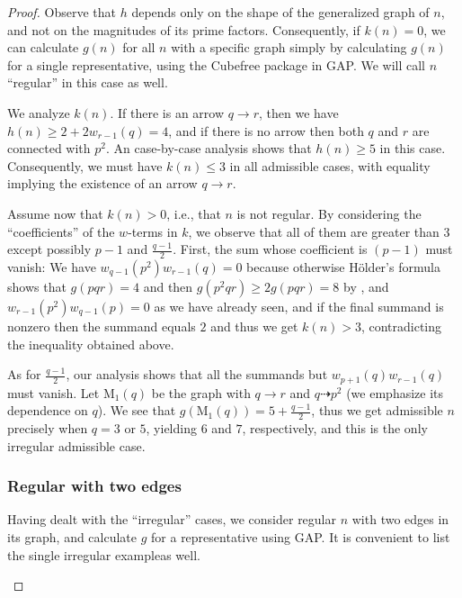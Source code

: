 \documentclass[a4paper, 12pt]{article}
\newcommand{\m}[1]{\text{M}_{#1}}
\newcommand{\hthref}[1]{\hyperref[#1]{\thref{#1}}}
\theoremstyle{plain}
\theoremstyle{definition}
\begin{document}
\begin{proof}
Observe that $h$ depends only on the shape of the generalized graph of $n$, and not on the magnitudes of its prime factors. Consequently, if $k(n) = 0$, we can calculate $g(n)$ for all $n$ with a specific graph simply by calculating $g(n)$ for a single representative, using the Cubefree package in GAP{\cite{cubefreepkg}}. We will call $n$ ``regular'' in this case as well.

We analyze $k(n)$. If there is an arrow $q \rightarrow r$, then we have $h(n) \ge 2 + 2w_{r - 1}(q) = 4$, and if there is no arrow then both $q$ and $r$ are connected with $p^2$. An case-by-case analysis shows that $h(n) \ge 5$ in this case. Consequently, we must have $k(n) \le 3$ in all admissible cases, with equality implying the existence of an arrow $q \rightarrow r$.

Assume now that $k(n) > 0$, i.e., that $n$ is not regular. By considering the ``coefficients'' of the $w$-terms in $k$, we observe that all of them are greater than $3$ except possibly $p - 1$ and $\frac{q - 1}{2}$. First, the sum whose coefficient is $(p - 1)$ must vanish: We have $w_{q - 1}(p^2) w_{r - 1}(q) = 0$ because otherwise Hölder's formula shows that $g(pqr) = 4$ and then $g(p^2 q r) \ge 2g(pqr) = 8$ by \hthref{eubold}, and $w_{r - 1}(p^2)w_{q - 1}(p) = 0$ as we have already seen, and if the final summand is nonzero then the summand equals $2$ and thus we get $k(n) > 3$, contradicting the inequality obtained above.

As for $\frac{q - 1}{2}$, our analysis shows that all the summands but $w_{p + 1}(q)w_{r - 1}(q)$ must vanish. Let $\m1(q)$ be the graph with $q \rightarrow r$ and $q \dashrightarrow p^2$ (we emphasize its dependence on $q$). We see that $g(\m1(q)) = 5 + \frac{q - 1}{2}$, thus we get admissible $n$ precisely when $q = 3$ or $5$, yielding $6$ and $7$, respectively, and this is the only irregular admissible case.

\subsubsection*{Regular  with two edges}
Having dealt with the ``irregular'' cases, we consider regular $n$ with two edges in its graph, and calculate $g$ for a representative using GAP. It is convenient to list the single irregular example\nolinebreak[4] as well.\vspace*{-\baselineskip}
\begin{center}

\resizebox{\textwidth}{!}{%
\begin{tikzpicture}
	

\end{tikzpicture}}
\end{center}
\end{proof}
\end{document}
